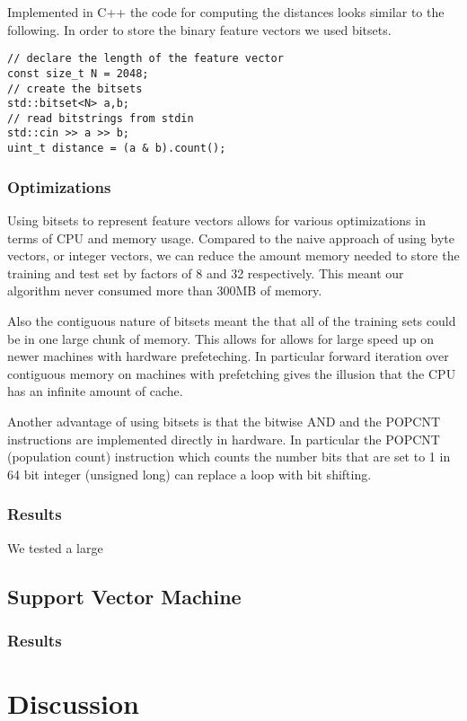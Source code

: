 \documentclass[10pt,twocolumn]{article}
\begin{document}
Implemented in C++ the code for computing the distances looks similar to the following. In order to store the binary feature vectors we used bitsets.

\begin{lstlisting}
// declare the length of the feature vector
const size_t N = 2048;
// create the bitsets
std::bitset<N> a,b;
// read bitstrings from stdin
std::cin >> a >> b; 
uint_t distance = (a & b).count();
\end{lstlisting}
\subsubsection{Optimizations}
Using bitsets to represent feature vectors allows for various optimizations in terms of CPU and memory usage. Compared to the naive approach of using byte vectors, or integer vectors, we can reduce the amount memory needed to store the training and test set by factors of 8 and 32 respectively. This meant our algorithm never consumed more than 300MB of memory. 

Also the contiguous nature of bitsets meant the that all of the training sets could be in one large chunk of memory. This allows for allows for large speed up on newer machines with hardware prefeteching. In particular forward iteration over contiguous memory on machines with prefetching gives the illusion that the CPU has an infinite amount of cache.

Another advantage of using bitsets is that the bitwise AND and the POPCNT instructions are implemented directly in hardware. In particular the POPCNT (population count) instruction which counts the number bits that are set to 1 in 64 bit integer (unsigned long) can replace a loop with bit shifting.
\subsubsection{Results}
We tested a large
\subsection{Support Vector Machine}
\subsubsection{Results}
\section{Discussion}
\end{document}
